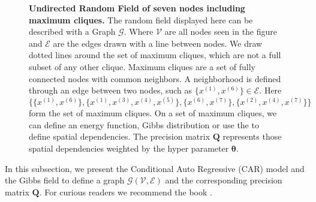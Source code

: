 \begin{figure}[thb!]
    \caption[Undirected Random Field of seven nodes including maximum cliques.]{\textbf{Undirected Random Field of seven nodes including maximum cliques.} The random field displayed here can be described with a Graph $\mathcal{G}$. Where $\mathcal{V}$ are all nodes seen in the figure and $\mathcal{E}$ are the edges drawn with a line between nodes. We draw dotted lines around the set of maximum cliques, which are not a full subset of any other clique. Maximum cliques are a set of fully connected nodes with common neighbors. A neighborhood is defined through an edge between two nodes, such as $\{ x^{(1)}, x^{(6)}\} \in \mathcal{E}$. Here $ \{ \{ x^{(1)}, x^{(6)}\}, \{ x^{(1)}, x^{(3)}, x^{(4)}, x^{(5)} \}, \{ x^{(6)}, x^{(7)} \}, \{ x^{(2)}, x^{(4)}, x^{(7)} \} \}$ form the set of maximum cliques.
    On a set of maximum cliques, we can define an energy function, Gibbs distribution or use the  to define spatial dependencies.
    The precision matrix $\bm{Q}$ represents those spatial dependencies weighted by the hyper parameter $\bm{\theta}$.}
    \label{fig:MRFGRAPH}
\end{figure}

In this subsection, we present the Conditional Auto Regressive (CAR) model and the Gibbs field to define a graph $\mathcal{G}(\mathcal{V},\mathcal{E})$ and the corresponding precision matrix $\bm{Q}$.
For curious readers we recommend the book \cite{bremaud2013markov}.

